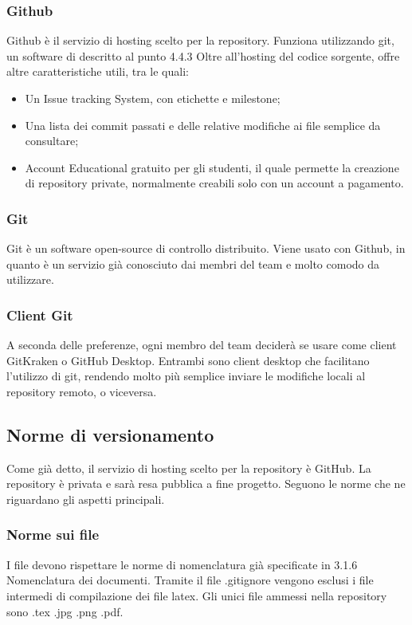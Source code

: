\subsubsection{Github}
Github è il servizio di hosting scelto per la repository. Funziona utilizzando git, un software di  descritto al punto 4.4.3 Oltre all'hosting del codice sorgente, offre altre caratteristiche utili, tra le quali:
\begin{itemize}
\item Un Issue tracking System, con etichette e milestone;
\item Una lista dei commit passati e delle relative modifiche ai file semplice da consultare;
\item Account Educational gratuito per gli studenti, il quale permette la creazione di repository private, normalmente creabili solo con un account a pagamento.
\end{itemize}

\subsubsection{Git}
Git è un software open-source di controllo  distribuito.
Viene usato con Github, in quanto è un servizio già conosciuto dai membri del team e molto comodo da utilizzare.

\subsubsection{Client Git}
A seconda delle preferenze, ogni membro del team deciderà se usare come client GitKraken o GitHub Desktop. Entrambi sono client desktop che facilitano l'utilizzo di git, rendendo molto più semplice inviare le modifiche locali al repository remoto, o viceversa.

\subsection{Norme di versionamento}
Come già detto, il servizio di hosting scelto per la repository è GitHub.
La repository è privata e sarà resa pubblica a fine progetto. Seguono le norme che ne riguardano gli aspetti principali.

\subsubsection{Norme sui file}
I file devono rispettare le norme di nomenclatura già specificate in 3.1.6 Nomenclatura dei documenti.
Tramite il file .gitignore vengono esclusi i file intermedi di compilazione dei file latex.
Gli unici file ammessi nella repository sono .tex .jpg .png .pdf.

